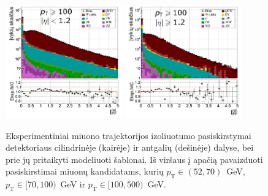 \documentclass[a4paper, 12pt, oneside]{article}
\newcommand{\pT}{p_{\mathrm{T}}}
\begin{document}
\begin{figure}[p!]
	\includegraphics[width=0.45\textwidth]{Kursinis3/TFit_DB_100to500.png}
	\includegraphics[width=0.45\textwidth]{Kursinis3/TFit_DE_100to500.png}
	\vspace{-0.2cm}
	\caption{\label{fig:templateFit}
		Eksperimentiniai miuono trajektorijos izoliuotumo pasiskirstymai detektoriaus cilindrinėje (kairėje)
		ir  antgalių (dešinėje) dalyse, bei prie jų pritaikyti modeliuoti šablonai.
		Iš viršaus į apačią pavaizduoti pasiskirstimai miuonų kandidatams, kurių $\pT\in(52, 70)$~GeV,
		$\pT\in[70, 100)$~GeV ir $\pT\in[100, 500)$~GeV.}
\end{figure}
\end{document}
